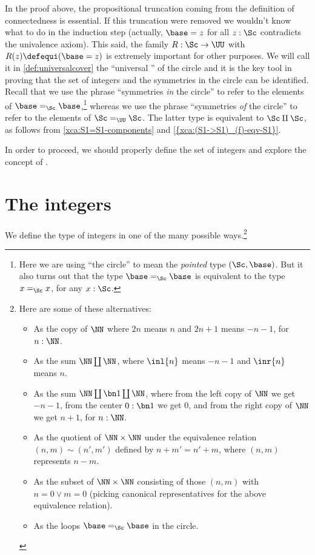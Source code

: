 In the proof above, the propositional truncation coming
from the definition of connectedness is essential.
If this truncation were removed we wouldn't know what to do in
the induction step (actually, ${\base=z}$ for all $z:\Sc$ contradicts the univalence axiom).
This said, the family $R:\Sc\to\UU$ with $R(z)\defequi (\base=z)$ is extremely
important for other purposes. We will call it in \cref{def:universalcover} the
``universal \covering'' of the circle and it is the key tool in proving that
the set of integers and the symmetries in the circle can be identified.
Recall that we
use the phrase ``symmetries \emph{in} the circle'' to refer to the
elements of $\base=_{\Sc}\base$,\footnote{%
  Here we are using ``the circle'' to mean the
  \emph{pointed} type $(\Sc,\base)$.
  But it also turns out that the type $\base=_{\Sc}\base$ is
  equivalent to the type $x=_{\Sc}x$, for any $x:\Sc$.}
whereas we use the phrase ``symmetries \emph{of} the circle'' to refer to the elements of $\Sc=_{\UU}\Sc$.
The latter type is equivalent to $\Sc\amalg\Sc$,
as follows from \cref{xca:S1=S1-components} and \cref{{xca:(S1->S1)_(f)-eqv-S1}}.

In order to proceed, we should properly define the set of integers
and explore the concept of \coverings.

\section{The integers}
\label{sec:integers}

We define the type of integers in one of the many possible ways.\footnote{%
  \label{ft:many-integers}Here are some of these alternatives:
  \begin{itemize}
  \item As the copy of $\NN$ where $2n$ means $n$ and $2n+1$ means $-n-1$, for $n:\NN$.
  \item As the sum $\NN\coprod\NN$, where $\inl{n}$ means $-n-1$ and $\inr{n}$ means $n$.
  \item As the sum $\NN\coprod\bn1\coprod\NN$, where from the left copy of $\NN$ we get $-n-1$, from the center $0:\bn1$ we get $0$, and from the right copy of $\NN$ we get $n+1$, for $n:\NN$.
  \item As the quotient of $\NN\times\NN$ under the equivalence relation
    $(n,m) \sim (n',m')$ defined by $n+m' = n'+m$,
    where $(n,m)$ represents $n-m$.
  \item As the subset of $\NN\times\NN$ consisting of those $(n,m)$ with $n=0\lor m=0$ (picking canonical representatives for the above equivalence relation).
  \item As the loops $\base=_\Sc\base$ in the circle. %
  \end{itemize}}

